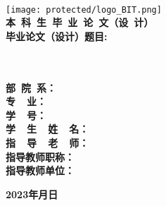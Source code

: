 
	

\begin{titlepage}
	\begin{center}
	\vspace*{-3em}\hrulefill
	\\	\vspace*{3em}
	{\texttt{[image: protected/logo\_BIT.png]}}
	\\[3em]
	{\textbf{\songti 本\ 科\ 生\ 毕\ 业\ 论\ 文（设\ 计）}}
	\\[6em]
	\textbf{\heiti 毕业论文（设计）题目:\quad\ \ \qquad\qquad\qquad\qquad\qquad\qquad\qquad\qquad}
	\\[0.5em]
	\textbf{\songti\underline{\makebox[28em][c]{\titlethesisCHNi}}}
	\\[0.5em]
	\textbf{\songti\underline{\makebox[28em][c]{\titlethesisCHNii}}}
	\\[4.5em]
	\end{center}
	\textbf{\songti \makebox[59pt][l]{}部\quad\ 院\quad\ 系：\quad}
	\\[0.7em]
	\textbf{\songti \makebox[59pt][l]{}专\qquad\quad\ \ 业：\quad}
	\\[0.7em]
	\textbf{\songti \makebox[59pt][l]{}学\qquad\quad\ \ 号：\quad}
	\\[0.7em]
	\textbf{\songti \makebox[59pt][l]{}学\ \ 生\ \ 姓\ \ 名：\quad}
	\\[0.7em]
	\textbf{\songti \makebox[59pt][l]{}指\ \ 导\ \ 老\ \ 师：\quad}
	\\[0.7em]
	\textbf{\songti \makebox[59pt][l]{}指导教师职称：\quad}
	\\[0.7em]
	\textbf{\songti \makebox[59pt][l]{}指导教师单位：\quad}
	\\[3em]
	\begin{center}
	\textbf{\qquad\qquad\qquad 2023年\quad 月\quad 日}

	\vfill
	
	\end{center}
\end{titlepage}
